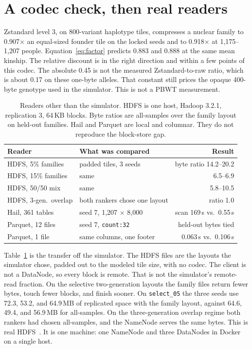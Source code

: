 \documentclass[11pt]{article}
\begin{document}
\FloatBarrier
\section{A codec check, then real readers}
\label{sec:codec}

Zstandard level 3, on 800-variant haplotype tiles, compresses a nuclear family to 0.907$\times$ an equal-sized founder tile on the locked seeds and to 0.918$\times$ at 1{,}175--1{,}207 people.
Equation~\eqref{eq:factor} predicts 0.883 and 0.888 at the same mean kinship.
The relative discount is in the right direction and within a few points of this codec.
The absolute 0.45 is not the measured Zstandard-to-raw ratio, which is about 0.17 on these one-byte alleles.
That constant still prices the opaque 400-byte genotype used in the simulator.
This is not a PBWT measurement.

\begin{table}[t]
  \centering
  \caption{Readers other than the simulator.
  HDFS is one host, Hadoop 3.2.1, replication 3, 64\,KB blocks.
  Byte ratios are all-samples over the family layout on held-out families.
  Hail and Parquet are local and columnar.
  They do not reproduce the block-store gap.}
  \label{tab:systems}
  \begin{tabular}{@{}llr@{}}
    \toprule
    Reader & What was compared & Result \\
    \midrule
    HDFS, 5\% families & padded tiles, 3 seeds & byte ratio 14.2--20.2 \\
    HDFS, 15\% families & same & 6.5--6.9 \\
    HDFS, 50/50 mix & same & 5.8--10.5 \\
    HDFS, 3-gen.\ overlap & both rankers chose one layout & ratio 1.0 \\
    Hail, 361 tables & seed 7, 1{,}207 $\times$ 8{,}000 & scan 169\,s vs.\ 0.55\,s \\
    Parquet, 12 files & seed 7, \texttt{count:32} & held-out bytes tied \\
    Parquet, 1 file & same columns, one footer & 0.063\,s vs.\ 0.106\,s \\
    \bottomrule
  \end{tabular}
\end{table}

Table~\ref{tab:systems} is the transfer off the simulator.
The HDFS files are the layouts the simulator chose, padded out to the modeled tile size, with no codec.
The client is not a DataNode, so every block is remote.
That is not the simulator's remote-read fraction.
On the selective two-generation layouts the family files return fewer bytes, touch fewer blocks, and finish sooner.
On \texttt{select\_05} the three seeds use 72.3, 53.2, and 64.9\,MB of replicated space with the family layout, against 64.6, 49.4, and 56.9\,MB for all-samples.
On the three-generation overlap regime both rankers had chosen all-samples, and the NameNode serves the same bytes.
This is real HDFS~\cite{shvachko2010hdfs}.
It is one machine: one NameNode and three DataNodes in Docker on a single host.
\end{document}
